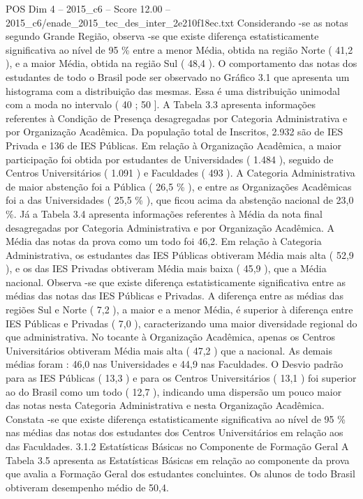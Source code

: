 \begin{textsample}{POS Dim 4 – 2015\_c6 – Score 12.00 – 2015\_c6/enade\_2015\_tec\_des\_inter\_2e210f18ec.txt}
Considerando -se as notas segundo Grande Região, observa -se que existe diferença estatisticamente significativa ao nível de 95 \% entre a menor Média, obtida na região Norte ( 41,2 ), e a maior Média, obtida na região Sul ( 48,4 ).
O comportamento das notas dos estudantes de todo o Brasil pode ser observado no Gráfico 3.1 que apresenta um histograma com a distribuição das mesmas.
Essa é uma distribuição unimodal com a moda no intervalo ( 40 ; 50 ].
A Tabela 3.3 apresenta informações referentes à Condição de Presença desagregadas por Categoria Administrativa e por Organização Acadêmica.
Da população total de Inscritos, 2.932 são de IES Privada e 136 de IES Públicas.
Em relação à Organização Acadêmica, a maior participação foi obtida por estudantes de Universidades ( 1.484 ), seguido de Centros Universitários ( 1.091 ) e Faculdades ( 493 ).
A Categoria Administrativa de maior abstenção foi a Pública ( 26,5 \% ), e entre as Organizações Acadêmicas foi a das Universidades ( 25,5 \% ), que ficou acima da abstenção nacional de 23,0 \%.
Já a Tabela 3.4 apresenta informações referentes à Média da nota final desagregadas por Categoria Administrativa e por Organização Acadêmica.
A Média das notas da prova como um todo foi 46,2.
Em relação à Categoria Administrativa, os estudantes das IES Públicas obtiveram Média mais alta ( 52,9 ), e os das IES Privadas obtiveram Média mais baixa ( 45,9 ), que a Média nacional.
Observa -se que existe diferença estatisticamente significativa entre as médias das notas das IES Públicas e Privadas.
A diferença entre as médias das regiões Sul e Norte ( 7,2 ), a maior e a menor Média, é superior à diferença entre IES Públicas e Privadas ( 7,0 ), caracterizando uma maior diversidade regional do que administrativa.
No tocante à Organização Acadêmica, apenas os Centros Universitários obtiveram Média mais alta ( 47,2 ) que a nacional.
As demais médias foram : 46,0 nas Universidades e 44,9 nas Faculdades.
O Desvio padrão para as IES Públicas ( 13,3 ) e para os Centros Universitários ( 13,1 ) foi superior ao do Brasil como um todo ( 12,7 ), indicando uma dispersão um pouco maior das notas nesta Categoria Administrativa e nesta Organização Acadêmica.
Constata -se que existe diferença estatisticamente significativa ao nível de 95 \% nas médias das notas dos estudantes dos Centros Universitários em relação aos das Faculdades. 3.1.2 Estatísticas Básicas no Componente de Formação Geral A Tabela 3.5 apresenta as Estatísticas Básicas em relação ao componente da prova que avalia a Formação Geral dos estudantes concluintes.
Os alunos de todo Brasil obtiveram desempenho médio de 50,4.

\end{textsample}

